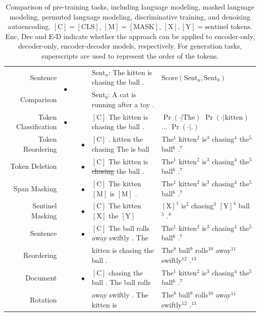 \begin{table}[!t]
{{\begin{tabular}{r | c | c | c | l | l }
{\color{cyan} Sentence} & \multirow{2}{*}{$\bullet$} & & & $\mathrm{Sent}_a$: The kitten is chasing the ball . & $\mathrm{Score}(\mathrm{Sent}_a, \mathrm{Sent}_b)$ \\
{\color{cyan} Comparison} & & & & $\mathrm{Sent}_b$: A cat is running after a toy . & \\ \hline
{\color{cyan} Token Classification} & $\bullet$ & & & $\mathrm{[C]}$ The kitten is chasing the ball . & $\Pr(\cdot|\textrm{The})$ $\Pr(\cdot|\textrm{kitten})$ ... $\Pr(\cdot|\textrm{.})$ \\ \hline \hline
{\color{orange} Token Reordering} & & & $\bullet$ & $\mathrm{[C]}$ . kitten the chasing The is ball & The$^1$ kitten$^2$ is$^3$ chasing$^4$ the$^5$ ball$^6$ .$^7$ \\ \hline
{\color{orange} Token Deletion} & & & $\bullet$ & $\mathrm{[C]}$ The kitten is {\color{gray} \sout{chasing}} the ball . & The$^1$ kitten$^2$ is$^3$ chasing$^4$ the$^5$ ball$^6$ .$^7$ \\ \hline
{\color{orange} Span Masking} & & & $\bullet$ & $\mathrm{[C]}$ The kitten $\mathrm{[M]}$ is $\mathrm{[M]}$ . & The$^1$ kitten$^2$ is$^3$ chasing$^4$ the$^5$ ball$^6$ .$^7$  \\ \hline
{\color{orange} Sentinel Masking} & & & $\bullet$ & $\mathrm{[C]}$ The kitten $\mathrm{[X]}$ the $\mathrm{[Y]}$ & $\mathrm{[X]}^1$ is$^2$ chasing$^3$ $\mathrm{[Y]}^4$ ball$^5$ .$^6$  \\ \hline
{\color{orange} Sentence} & & & $\bullet$ & $\mathrm{[C]}$ The ball rolls away swiftly . The & The$^1$ kitten$^2$ is$^3$ chasing$^4$ the$^5$ ball$^6$ .$^7$ \\
{\color{orange} Reordering} & & & &  kitten is chasing the ball . & The$^8$ ball$^9$ rolls$^{10}$ away$^{11}$ swiftly$^{12}$ .$^{13}$ \\ \hline
{\color{orange} Document} & & & $\bullet$ & $\mathrm{[C]}$ chasing the ball . The ball rolls & The$^1$ kitten$^2$ is$^3$ chasing$^4$ the$^5$ ball$^6$ .$^7$ \\
{\color{orange} Rotation} & & & &  away swiftly . The kitten is & The$^8$ ball$^9$ rolls$^{10}$ away$^{11}$ swiftly$^{12}$ .$^{13}$
\end{tabular}
}
} %
\endgroup
\caption{Comparison of pre-training tasks, including {\color{purple} language modeling}, {\color{teal} masked language modeling}, {\color{brown} permuted language modeling}, {\color{cyan} discriminative training}, and {\color{orange} denoising autoencoding}. $\mathrm{[C]} = \mathrm{[CLS]}$, $\mathrm{[M]} = \mathrm{[MASK]}$, $\mathrm{[X]}, \mathrm{[Y]} = \textrm{sentinel tokens}$. Enc, Dec and E-D indicate whether the approach can be applied to encoder-only, decoder-only, encoder-decoder models, respectively. For generation tasks, superscripts are used to represent the order of the tokens.}
\label{tab:comparison-of-pre-training-tasks}
\end{table}

